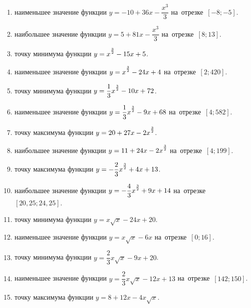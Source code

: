 \documentclass[a4paper,10pt]{article}
\begin{document}
\begin{enumerate}
\item {} наименьшее значение функции $y=-10 +36x-\dfrac{x^3}{3}$ на~отрезке~$\left[-8;-5\right]$.

\item {} наибольшее значение функции $y=5 +81x-\dfrac{x^3}{3}$ на~отрезке~$\left[8;13\right]$.

\item {} точку минимума функции $y=x\strut^{\frac{3}{2}} -15x+5$.

\item {} наименьшее значение функции $y=x\strut^{\frac{3}{2}} -24x+4$ на~отрезке~$\left[2;420\right]$.

\item {} точку минимума функции $y=\dfrac{1}{3}x\strut^{\frac{3}{2}} -10x+72$.

\item {} наименьшее значение функции $y=\dfrac{1}{3}x\strut^{\frac{3}{2}} -9x+68$ на~отрезке~$\left[4;582\right]$.

\item {} точку максимума функции $y=20+27x-2x\strut^{\frac{3}{2}}$.

\item {} наибольшее значение функции $y=11+24x-2x\strut^{\frac{3}{2}}$ на~отрезке~$\left[4;199\right]$.

\item {} точку максимума функции $y=-\dfrac{2}{3}x\strut^{\frac{3}{2}} +4x+13$.

\item {} наибольшее значение функции $y=-\dfrac{4}{3}x\strut^{\frac{3}{2}} +9x+14$ на~отрезке~$\left[20,25;24,25\right]$.

\item {} точку минимума функции $y=x\sqrt{x} -24x+20$.

\item {} наименьшее значение функции $y=x\sqrt{x} -6x$ на~отрезке~$\left[0;16\right]$.

\item {} точку минимума функции $y=\dfrac{2}{3}x\sqrt{x} -9x+20$.

\item {} наименьшее значение функции $y=\dfrac{2}{3}x\sqrt{x} -12x+13$ на~отрезке~$\left[142;150\right]$.

\item {} точку максимума функции $y=8+12x -4x\sqrt{x}$.


\end{enumerate}
\end{document}
